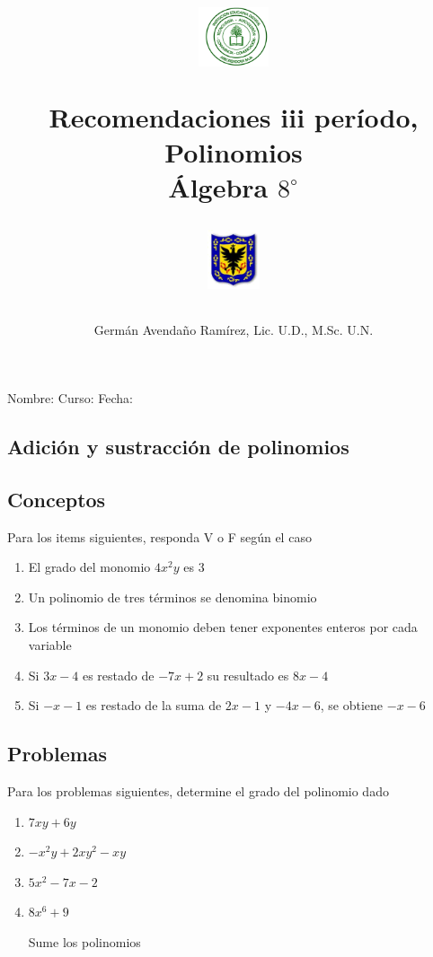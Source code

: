\documentclass[letterpaper,11pt,twoside]{article}
\author{Germ\'an Avenda\~no Ram\'irez, Lic. U.D., M.Sc. U.N.}
\title{\begin{minipage}{.2\textwidth}
\includegraphics[height=1.75cm]{Images/logo-colegio.png}\end{minipage}
\begin{minipage}{.55\textwidth}
\begin{center}
Recomendaciones iii período, Polinomios\\
Álgebra $8^{\circ}$
\end{center}
\end{minipage}\hfill
\begin{minipage}{.2\textwidth}
\includegraphics[height=1.75cm]{Images/logo-sed.png} 
\end{minipage}}
\date{}
\begin{document}
\maketitle
Nombre: \hrulefill Curso: \underline{\hspace*{44pt}} Fecha: \underline{\hspace*{2.5cm}}\\


\begin{multicols}{2}
\section*{Adici\'{o}n y sustracci\'{o}n de polinomios}
 \subsection*{Conceptos}
 Para los items siguientes, responda V o F según el caso
 \begin{enumerate}
 \item El grado del monomio $4x^{2}y$ es 3
 \item Un polinomio de tres términos se denomina binomio
 \item Los términos de un monomio deben tener exponentes enteros por cada variable
 \item Si $3x-4$ es restado de $-7x+2$ su resultado es $8x-4$
 \item Si $-x-1$ es restado de la suma de $2x-1$ y $-4x-6$, se obtiene $-x-6$
 \end{enumerate}
 \subsection*{Problemas}
 Para los problemas siguientes, determine el grado del polinomio dado
 \begin{enumerate}
 \item $7xy+6y$
 \item $-x^{2}y+2xy^{2}-xy$
 \item $5x^{2}-7x-2$
 \item $8x^{6}+9$
 
Sume los polinomios


\end{enumerate}
\end{multicols}
\end{document}
